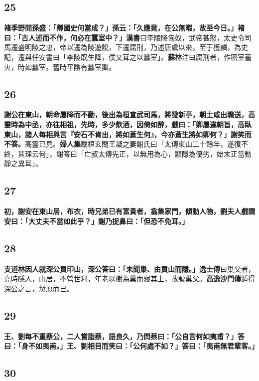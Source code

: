 \subsection*{25}

\textbf{褚季野問孫盛：「卿國史何當成？」孫云：「久應竟，在公無暇，故至今日。」褚曰：「古人述而不作，何必在蠶室中？」}{\footnotesize \textbf{漢書}曰李陵降匈奴，武帝甚怒，太史令司馬遷盛明陵之忠，帝以遷為陵遊說，下遷腐刑，乃述唐虞以來，至于獲麟，為史記，遷與任安書曰「李陵既生降，僕又茸之以蠶室」。\textbf{蘇林}注曰腐刑者，作密室蓄火，時如蠶室。舊時平陰有蠶室獄。}

\subsection*{26}

\textbf{謝公在東山，朝命屢降而不動，後出為桓宣武司馬，將發新亭，朝士咸出瞻送，高靈時為中丞，亦往相祖，先時，多少飲酒，因倚如醉，戲曰：「卿屢違朝旨，高臥東山，諸人每相與言『安石不肯出，將如蒼生何』，今亦蒼生將如卿何？」謝笑而不答。}{\footnotesize 高靈已見。\textbf{婦人集}載桓玄問王凝之妻謝氏曰「太傅東山二十餘年，遂復不終，其理云何」，謝答曰「亡叔太傅先正，以無用為心，顯隱為優劣，始末正當動靜之異耳」。}

\subsection*{27}

\textbf{初，謝安在東山居，布衣，時兄弟已有富貴者，翕集家門，傾動人物，劉夫人戲謂安曰：「大丈夫不當如此乎？」謝乃捉鼻曰：「但恐不免耳。」}

\subsection*{28}

\textbf{支道林因人就深公買印山，深公答曰：「未聞巢、由買山而隱。」}{\footnotesize \textbf{逸士傳}曰巢父者，堯時隱人，山居，不營世利，年老以樹為巢而寢其上，故號巢父。\textbf{高逸沙門傳}遁得深公之言，慙恧而已。}

\subsection*{29}

\textbf{王、劉每不重蔡公，二人嘗詣蔡，語良久，乃問蔡曰：「公自言何如夷甫？」答曰：「身不如夷甫。」王、劉相目而笑曰：「公何處不如？」答曰：「夷甫無君輩客。」}

\subsection*{30}

